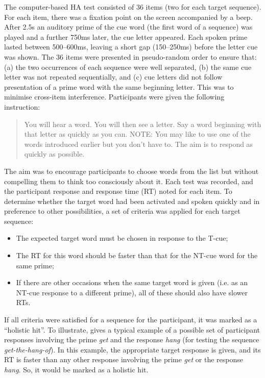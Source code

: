\documentclass[output=paper]{langscibook}
\begin{document}
The computer-based HA test consisted of 36 items (two for each target sequence). For each item, there was a fixation point on the screen accompanied by a beep. After 2.5s an auditory prime of the cue word (the first word of a sequence) was played and a further 750ms later, the cue letter appeared. Each spoken prime lasted between 500--600ms, leaving a short gap (150--250ms) before the letter cue was shown. The 36 items were presented in pseudo-random order to ensure that: (a) the two occurrences of each sequence were well separated, (b) the same cue letter was not repeated sequentially, and (c) cue letters did not follow presentation of a prime word with the same beginning letter. This was to minimise cross-item interference. Participants were given the following instruction: 

\begin{quote}
You will hear a word. You will then see a letter. Say a word beginning with that letter as quickly as you can. NOTE: You may like to use one of the words introduced earlier but you don’t have to. The aim is to respond as quickly as possible.
\end{quote}

The aim was to encourage participants to choose words from the list but without compelling them to think too consciously about it. Each test was recorded, and the participant response and response time (RT) noted for each item. To determine whether the target word had been activated and spoken quickly and in preference to other possibilities, a set of criteria was applied for each target sequence:

\begin{itemize}
\item The expected target word must be chosen in response to the T-cue;
\item The RT for this word should be faster than that for the NT-cue word for the same prime;
\item If there are other occasions when the same target word is given (i.e. as an NT-cue response to a different prime), all of these should also have slower RTs.
\end{itemize}

If all criteria were satisfied for a sequence for the participant, it was marked as a ``holistic hit''. To illustrate,  gives a typical example of a possible set of participant responses involving the prime \textit{get} and the response \textit{hang} (for testing the sequence \textit{get-the-hang-of}). In this example, the appropriate target response is given, and its RT is faster than any other response involving the prime \textit{get} or the response \textit{hang}. So, it would be marked as a holistic hit.
\end{document}
